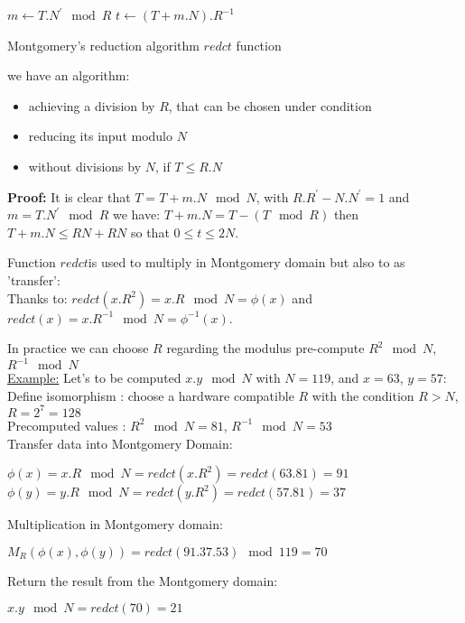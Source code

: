 \begin{itemize}
		    	   		  		   
			\begin{algorithm}
				$m \leftarrow	 T.N^{'} \mod R$ \;
				$t \leftarrow	 (T+m.N).R^{-1}$ \;
				\;
				\caption{Montgomery's reduction algorithm $redct$ function}
			\end{algorithm}				
			we have  an algorithm:
			\begin{itemize}
				\item achieving a division by $R$, that can be chosen under condition
				\item reducing its input modulo $N$
				\item without divisions by $N$, if $T \leq R.N$
			\end{itemize}

		\textbf{Proof:}
			It is clear that $ T = T + m.N \mod N $, with $R.R^{'}-N.N^{'}=1$ and 
			$ m = T.N^{'} \mod R$ we have: $  T + m.N = T- (T \mod R)$ then 
			$  T + m.N \leq RN + RN$ so that $ 0 \leq t \leq 2N $.

			Function  $redct$is used to multiply in Montgomery domain but also 
			to as 'transfer':\\
			Thanks to: $ redct(x.R^2) = x.R \mod N = \phi(x) $ and $redct(x) = x.R^{-1} \mod N = \phi^{-1}(x) $.

			In practice we can choose $R$ regarding the modulus pre-compute $R^2 \mod N$, $R^{-1} \mod N$\\
 		  
		\underline{Example:}
			Let's to be computed $x.y \mod N$  with $N = 119$, and $x = 63$, $y = 57$:\\
			Define isomorphism :
			choose a hardware compatible $R$ with the condition $R > N$,  $R =2^7 = 128$\\ 
			Precomputed values : $R^2 \mod N = 81$, $R^{-1} \mod  N = 53$\\
			Transfer data into Montgomery Domain: 
			\begin{center}
				$ \phi(x) = x.R \mod N  = redct(x.R^2) = redct(63.81) = 91 $\\
				$ \phi(y) = y.R \mod N  = redct(y.R^2) = redct(57.81) = 37$\\
			\end{center}
			Multiplication in Montgomery domain: 
			\begin{center}
				$ M_R(\phi(x),\phi(y)) = redct(91.37.53) \mod 119 = 70$
			\end{center}
			Return the result from the Montgomery domain: 
			\begin{center}
				$x.y \mod N = redct(70) = 21$	
			\end{center}
			

\end{itemize}
